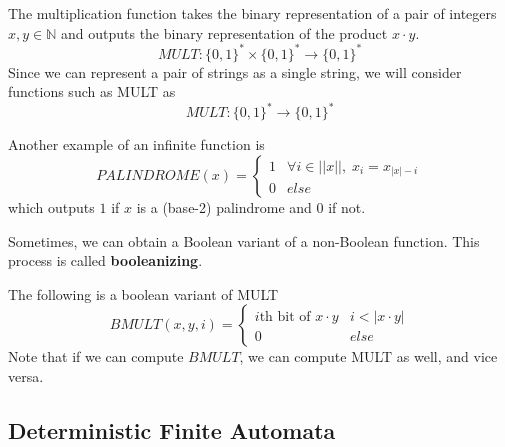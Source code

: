 \documentclass{article}
\begin{document}
  \begin{example}
  The multiplication function takes the binary representation of a pair of integers $x, y \in \mathbb{N}$ and outputs the binary representation of the product $x \cdot y$. 
  \[MULT: \{0,1\}^* \times \{0,1\}^* \longrightarrow \{0,1\}^*\]
  Since we can represent a pair of strings as a single string, we will consider functions such as MULT as
  \[MULT: \{0,1\}^* \longrightarrow \{0,1\}^*\]
  \end{example}

  \begin{example}
  Another example of an infinite function is 
  \[PALINDROME (x) = \begin{cases}
  1 & \forall i \in ||x||, \; x_i = x_{|x|-i} \\
  0 & else
  \end{cases}\]
  which outputs $1$ if $x$ is a (base-2) palindrome and $0$ if not. 
  \end{example}

  \begin{definition}
  Sometimes, we can obtain a Boolean variant of a non-Boolean function. This process is called \textbf{booleanizing}. 
  \end{definition}

  \begin{example}
  The following is a boolean variant of MULT
  \[BMULT(x, y, i) = \begin{cases}
  i\text{th bit of } x\cdot y & i < |x \cdot y|\\
  0 & else
  \end{cases}\]
  Note that if we can compute $BMULT$, we can compute MULT as well, and vice versa. 
  \end{example}

  \subsection{Deterministic Finite Automata}
\end{document}
